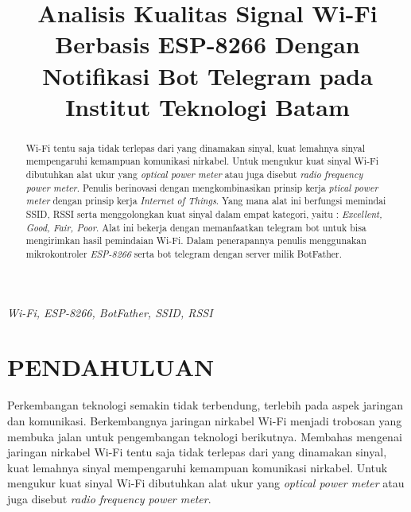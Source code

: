 \documentclass[conference]{IEEEtran}
\begin{document}
\title{Analisis Kualitas Signal Wi-Fi Berbasis ESP-8266
Dengan Notifikasi Bot Telegram pada Institut
Teknologi Batam}


\author{
}

\maketitle

\begin{abstract}
Wi-Fi tentu saja tidak terlepas dari yang dinamakan sinyal,
kuat lemahnya sinyal mempengaruhi kemampuan komunikasi nirkabel.
Untuk mengukur kuat sinyal Wi-Fi dibutuhkan alat ukur yang \textit{optical power meter} atau juga disebut \textit{radio frequency power meter}. Penulis berinovasi
dengan mengkombinasikan prinsip kerja \textit{ptical power meter} dengan prinsip kerja \textit{Internet of Things}. Yang mana alat ini berfungsi memindai SSID, RSSI serta menggolongkan kuat sinyal dalam empat kategori, yaitu : \textit{Excellent, Good, Fair, Poor}. Alat ini bekerja dengan memanfaatkan telegram bot untuk bisa mengirimkan hasil pemindaian Wi-Fi. Dalam penerapannya penulis menggunakan mikrokontroler \textit{ESP-8266} serta bot telegram dengan server milik BotFather.
\end{abstract}

\begin{IEEEkeywords}
\textit{Wi-Fi, ESP-8266, BotFather, SSID, RSSI}
\end{IEEEkeywords}

\section{PENDAHULUAN}
Perkembangan teknologi semakin tidak terbendung, terlebih pada aspek
jaringan dan komunikasi. Berkembangnya jaringan nirkabel Wi-Fi menjadi trobosan yang membuka jalan untuk pengembangan teknologi berikutnya. Membahas mengenai jaringan nirkabel Wi-Fi tentu saja tidak terlepas dari yang dinamakan sinyal, kuat lemahnya sinyal mempengaruhi kemampuan komunikasi nirkabel. Untuk mengukur kuat sinyal Wi-Fi dibutuhkan alat ukur yang \textit{optical power meter} atau juga disebut \textit{radio frequency power meter}.
\end{document}
